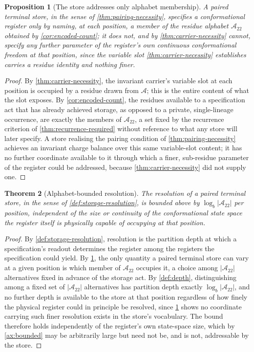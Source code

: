 \documentclass[11pt,twocolumn,a4paper]{article}
\theoremstyle{plain}
\newtheorem{theorem}{Theorem}[section]
\newtheorem{proposition}[theorem]{Proposition}
\theoremstyle{definition}
\theoremstyle{remark}
\newcommand{\Resset}{\mathcal{A}}
\begin{document}
\begin{proposition}[The store addresses only alphabet membership]
\label{prop:alphabet-addressable}
A paired terminal store, in the sense of \cref{thm:pairing-necessity},
specifies a conformational register only by naming, at each position, a
member of the residue alphabet $\Resset_{22}$ obtained by
\cref{cor:encoded-count}; it does not, and by
\cref{thm:carrier-necessity} cannot, specify any further parameter of the
register's own continuous conformational freedom at that position, since
the variable slot \cref{thm:carrier-necessity} establishes carries a
residue identity and nothing finer.
\end{proposition}

\begin{proof}
By \cref{thm:carrier-necessity}, the invariant carrier's variable slot at
each position is occupied by a residue drawn from $\Resset$; this is the
entire content of what the slot exposes. By \cref{cor:encoded-count}, the
residues available to a specification act that has already achieved
storage, as opposed to a private, single-lineage occurrence, are exactly
the members of $\Resset_{22}$, a set fixed by the recurrence criterion of
\cref{thm:recurrence-required} without reference to what any store will
later specify. A store realising the pairing condition of
\cref{thm:pairing-necessity} achieves an invariant charge balance over
this same variable-slot content; it has no further coordinate available to
it through which a finer, sub-residue parameter of the register could be
addressed, because \cref{thm:carrier-necessity} did not supply one.
\end{proof}

\begin{theorem}[Alphabet-bounded resolution]
\label{thm:alphabet-ceiling}
The resolution of a paired terminal store, in the sense of
\cref{def:storage-resolution}, is bounded above by $\log_b |\Resset_{22}|$
per position, independent of the size or continuity of the conformational
state space the register itself is physically capable of occupying at
that position.
\end{theorem}

\begin{proof}
By \cref{def:storage-resolution}, resolution is the partition depth at
which a specification's readout determines the register among the
registers the specification could yield. By
\cref{prop:alphabet-addressable}, the only quantity a paired terminal
store can vary at a given position is which member of $\Resset_{22}$
occupies it, a choice among $|\Resset_{22}|$ alternatives fixed in advance
of the storage act. By \cref{def:depth}, distinguishing among a fixed set
of $|\Resset_{22}|$ alternatives has partition depth exactly
$\log_b|\Resset_{22}|$, and no further depth is available to the store at
that position regardless of how finely the physical register could in
principle be resolved, since \cref{prop:alphabet-addressable} shows no
coordinate carrying such finer resolution exists in the store's
vocabulary. The bound therefore holds independently of the register's own
state-space size, which by \cref{ax:bounded} may be arbitrarily large but
need not be, and is not, addressable by the store.
\end{proof}
\end{document}
